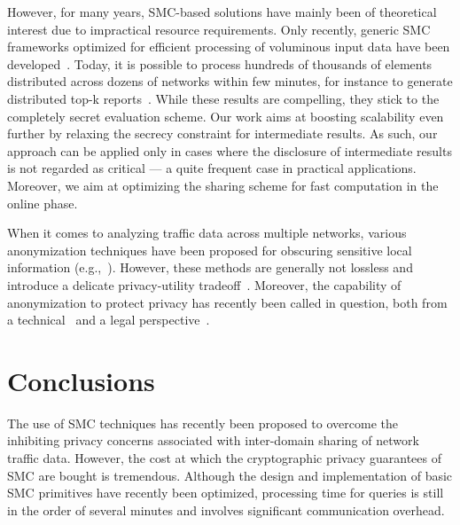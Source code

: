 \documentclass{sig-alternate}
\begin{document}
However, for many years, SMC-based solutions have mainly been of theoretical interest due
to impractical resource requirements. Only recently, generic SMC frameworks optimized for
efficient processing of voluminous input data have been developed~\cite{sepia10, Sharemind}.
Today, it is possible to process hundreds of thousands of elements distributed across
dozens of networks within few minutes, for instance to generate distributed top-k reports~\cite{burkhart-topk}.
While these results are compelling, they stick to the completely secret evaluation scheme.
Our work aims at boosting scalability even further by relaxing the secrecy constraint for intermediate results.
As such, our approach can be applied only in cases where the disclosure of intermediate results is not regarded as critical --- a quite frequent case in practical applications.
Moreover, we aim 
at optimizing the sharing scheme for fast computation in the online phase.

When it comes to analyzing traffic data across multiple networks, various anonymization techniques have been
proposed for obscuring sensitive local information (e.g.,~\cite{Slagell2006Flaim}). However,
these methods are generally not lossless and introduce a delicate privacy-utility tradeoff~\cite{Pang2006tcpmkpub}.
Moreover, the capability of anonymization to protect privacy has recently been called in question, both from a technical~\cite{burkhart2010anonymization} 
and a legal perspective~\cite{Ohm2010}.

\section{Conclusions}

The use of SMC techniques has recently been proposed to overcome the inhibiting privacy concerns associated with inter-domain sharing of network traffic data. 
However, the cost at which the cryptographic privacy guarantees of SMC are bought is tremendous.
Although the design and implementation of basic SMC primitives have recently been optimized, processing time for queries is still in the order of several minutes and involves significant communication overhead.
\end{document}
